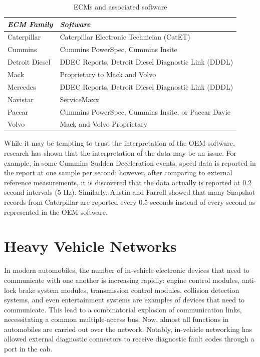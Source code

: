 \begin{table}
\centering
\begin{tabular}{|l|l|}
\hline
\emph{ECM Family} & \emph{Software}\\
\hline
Caterpillar & Caterpillar Electronic Technician (CatET)\\
\hline
Cummins & Cummins PowerSpec, Cummins Insite\\
\hline
Detroit Diesel & DDEC Reports, Detroit Diesel Diagnostic Link (DDDL)\\
\hline
Mack & Proprietary to Mack and Volvo\\
\hline
Mercedes & DDEC Reports, Detroit Diesel Diagnostic Link (DDDL)\\
\hline
Navistar & ServiceMaxx \\
\hline
Paccar & Cummins PowerSpec, Cummins Insite, or Paccar Davie\\
\hline
Volvo & Mack and Volvo Proprietary\\
\hline
\end{tabular}
\caption{ECMs and associated software}
\label{tab:software}
\end{table}
While it may be tempting to trust the interpretation of the OEM software, research has shown 
that the interpretation of the data may be an issue. For example, in some Cummins Sudden Deceleration 
events, speed data is reported in the report at one sample per second; however, after comparing to 
external reference measurements, it is discovered that the data actually is reported at 0.2 second 
intervals (5 Hz)\cite{bortolin2009}. Similarly, Austin and Farrell \cite{austin2011} showed that many Snapshot records 
from Caterpillar are reported every 0.5 seconds instead of every second as represented in the OEM software.

\section{Heavy Vehicle Networks}

In modern automobiles, the number of in-vehicle electronic devices that need to communicate with one another is increasing rapidly:
engine control modules, anti-lock brake system modules, transmission control modules, collision detection systems, and even entertainment systems are examples of
devices that need to communicate. This lead to a combinatorial explosion of communication links, necessitating a common multiple-access
bus. Now, almost all functions in automobiles are carried out over the network. Notably, in-vehicle networking has allowed external diagnostic
connectors to receive diagnostic fault codes through a port in the cab.

